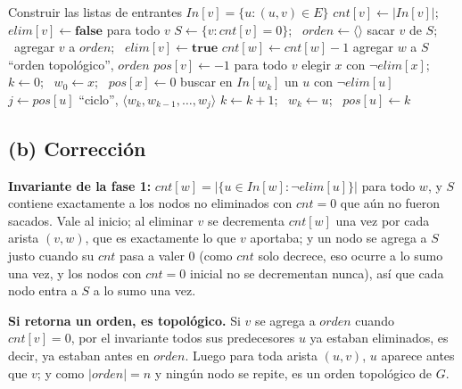 \begin{algorithm}[H]
\caption{Orden topológico o ciclo}
\begin{algorithmic}[1]
  \State Construir las listas de entrantes $In[v]=\{u:(u,v)\in E\}$
  \State $cnt[v]\gets|In[v]|$; \ $elim[v]\gets\textbf{false}$ para todo $v$
  \State $S\gets\{v:cnt[v]=0\}$; \ $orden\gets\langle\rangle$
   
    \State sacar $v$ de $S$; \ agregar $v$ a $orden$; \ $elim[v]\gets\textbf{true}$
      \State $cnt[w]\gets cnt[w]-1$
       agregar $w$ a $S$ \EndIf
    \EndFor
  \EndWhile
   \State \Return ``orden topológico'', $orden$ \EndIf
  \Statex {}
  \State $pos[v]\gets-1$ para todo $v$
  \State elegir $x$ con $\neg elim[x]$; \ $k\gets0$; \ $w_0\gets x$; \ $pos[x]\gets0$
  \Loop
    \State buscar en $In[w_k]$ un $u$ con $\neg elim[u]$
     
      \State $j\gets pos[u]$
      \State \Return ``ciclo'', $\langle w_k, w_{k-1},\dots,w_{j}\rangle$ 
    \EndIf
    \State $k\gets k+1$; \ $w_k\gets u$; \ $pos[u]\gets k$
  \EndLoop
\EndFunction
\end{algorithmic}
\end{algorithm}

\subsection*{(b) Corrección}
\textbf{Invariante de la fase 1:} $cnt[w]=|\{u\in In[w]:\neg elim[u]\}|$ para todo $w$, y $S$ contiene
exactamente a los nodos no eliminados con $cnt=0$ que aún no fueron sacados. Vale al inicio; al eliminar
$v$ se decrementa $cnt[w]$ una vez por cada arista $(v,w)$, que es exactamente lo que $v$ aportaba; y un
nodo se agrega a $S$ justo cuando su $cnt$ pasa a valer 0 (como $cnt$ solo decrece, eso ocurre a lo sumo
una vez, y los nodos con $cnt=0$ inicial no se decrementan nunca), así que cada nodo entra a $S$ a lo
sumo una vez.

\textbf{Si retorna un orden, es topológico.} Si $v$ se agrega a $orden$ cuando $cnt[v]=0$, por el
invariante todos sus predecesores $u$ ya estaban eliminados, es decir, ya estaban antes en $orden$. Luego
para toda arista $(u,v)$, $u$ aparece antes que $v$; y como $|orden|=n$ y ningún nodo se repite, es un
orden topológico de $G$.

